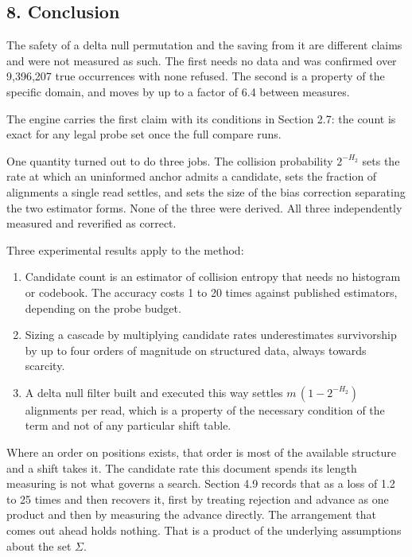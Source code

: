 \subsection{8. Conclusion}

The safety of a delta null permutation and the saving from it are different claims and were not
measured as such. The first needs no data and was confirmed over 9,396,207 true occurrences with
none refused. The second is a property of the specific domain, and moves by up to a factor of 6.4
between measures.

The engine carries the first claim with its conditions in Section 2.7: the count is exact for any
legal probe set once the full compare runs.

One quantity turned out to do three jobs. The collision probability \(2^{-H_2}\) sets the rate at
which an uninformed anchor admits a candidate, sets the fraction of alignments a single read
settles, and sets the size of the bias correction separating the two estimator forms. None of the
three were derived. All three independently measured and reverified as correct.

Three experimental results apply to the method:

\begin{enumerate}
  \item Candidate count is an estimator of collision entropy that needs no histogram or codebook.
    The accuracy costs 1 to 20 times against published estimators, depending on the probe budget.
  \item Sizing a cascade by multiplying candidate rates underestimates survivorship by up to four
    orders of magnitude on structured data, always towards scarcity.
  \item A delta null filter built and executed this way settles \(m\,(1 - 2^{-H_2})\) alignments
    per read, which is a property of the necessary condition of the term and not of any particular
    shift table.
\end{enumerate}

Where an order on positions exists, that order is most of the available structure and a shift takes it. The candidate rate this document spends its length measuring is not what governs a search. Section 4.9 records that as a loss of 1.2 to 25 times and then recovers it, first by treating rejection and advance as one product and then by measuring the advance directly. The arrangement that comes out ahead holds nothing. That is a product of the underlying assumptions about the set $\Sigma$.

